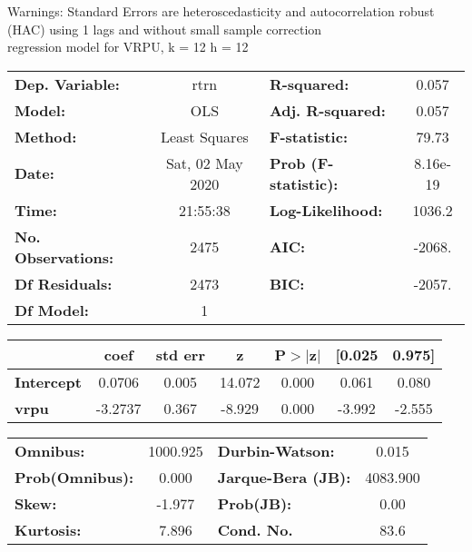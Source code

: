 Warnings: \newline
 [1] Standard Errors are heteroscedasticity and autocorrelation robust (HAC) using 1 lags and without small sample correction\\ 

regression model for VRPU, k = 12 h = 12\begin{center}
\begin{tabular}{lclc}
\toprule
\textbf{Dep. Variable:}    &       rtrn       & \textbf{  R-squared:         } &     0.057   \\
\textbf{Model:}            &       OLS        & \textbf{  Adj. R-squared:    } &     0.057   \\
\textbf{Method:}           &  Least Squares   & \textbf{  F-statistic:       } &     79.73   \\
\textbf{Date:}             & Sat, 02 May 2020 & \textbf{  Prob (F-statistic):} &  8.16e-19   \\
\textbf{Time:}             &     21:55:38     & \textbf{  Log-Likelihood:    } &    1036.2   \\
\textbf{No. Observations:} &        2475      & \textbf{  AIC:               } &    -2068.   \\
\textbf{Df Residuals:}     &        2473      & \textbf{  BIC:               } &    -2057.   \\
\textbf{Df Model:}         &           1      & \textbf{                     } &             \\
\bottomrule
\end{tabular}
\begin{tabular}{lcccccc}
                   & \textbf{coef} & \textbf{std err} & \textbf{z} & \textbf{P$> |$z$|$} & \textbf{[0.025} & \textbf{0.975]}  \\
\midrule
\textbf{Intercept} &       0.0706  &        0.005     &    14.072  &         0.000        &        0.061    &        0.080     \\
\textbf{vrpu}      &      -3.2737  &        0.367     &    -8.929  &         0.000        &       -3.992    &       -2.555     \\
\bottomrule
\end{tabular}
\begin{tabular}{lclc}
\textbf{Omnibus:}       & 1000.925 & \textbf{  Durbin-Watson:     } &    0.015  \\
\textbf{Prob(Omnibus):} &   0.000  & \textbf{  Jarque-Bera (JB):  } & 4083.900  \\
\textbf{Skew:}          &  -1.977  & \textbf{  Prob(JB):          } &     0.00  \\
\textbf{Kurtosis:}      &   7.896  & \textbf{  Cond. No.          } &     83.6  \\
\bottomrule
\end{tabular}
\end{center}

